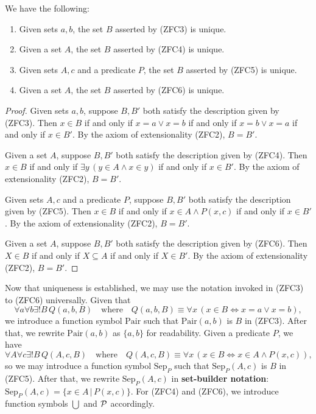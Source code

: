 \begin{prop}
	We have the following:
	\begin{enumerate}[itemsep=-0.4ex, label=\textup{(\alph*)}]
		\item Given sets $a, b$, the set $B$ asserted by \textup{(ZFC3)} is unique.
		\item Given a set $A$, the set $B$ asserted by \textup{(ZFC4)} is unique.
		\item Given sets $A, c$ and a predicate $P$, the set $B$ asserted by \textup{(ZFC5)} is unique.
		\item Given a set $A$, the set $B$ asserted by \textup{(ZFC6)} is unique.
	\end{enumerate}
\end{prop}
\begin{proof}
	Given sets $a, b$, suppose $B, B'$ both satisfy the description given by (ZFC3).
	Then $x\in B$ if and only if $x=a\lor x=b$ if and only if $x=b\lor x=a$ if and only if $x\in B'$.
	By the axiom of extensionality (ZFC2), $B = B'$.
	
	Given a set $A$, suppose $B, B'$ both satisfy the description given by (ZFC4).
	Then $x\in B$ if and only if $\exists y\, (y\in A\land x\in y)$ if and only if $x\in B'$.
	By the axiom of extensionality (ZFC2), $B = B'$.
	
	Given sets $A, c$ and a predicate $P$, suppose $B, B'$ both satisfy the description given by (ZFC5).
	Then $x\in B$ if and only if $x\in A \land P(x, c)$ if and only if $x\in B'$.
	By the axiom of extensionality (ZFC2), $B = B'$.
	
	Given a set $A$, suppose $B, B'$ both satisfy the description given by (ZFC6). 
	Then $X\in B$ if and only if $X\subseteq A$ if and only if $X\in B'$. 
	By the axiom of extensionality (ZFC2), $B = B'$.
\end{proof}

Now that uniqueness is established, we may use the notation invoked in (ZFC3) to (ZFC6) universally. 
Given that
\[ \forall a\forall b\exists ! B\, Q(a, b, B) \quad\text{where}\quad Q(a, b, B)\equiv \forall x\, (x\in B\iff x=a\lor x=b), \]
we introduce a function symbol $\textrm{Pair}$ such that $\textrm{Pair}(a, b)$ is $B$ in (ZFC3).
After that, we rewrite $\textrm{Pair}(a, b)$ as $\{a, b\}$ for readability. 
Given a predicate $P$, we have
\[ \forall A\forall c\exists ! B\, Q(A, c, B) \quad\text{where}\quad Q(A, c, B)\equiv \forall x\, (x\in B \iff x\in A\land P(x, c)), \]
so we may introduce a function symbol $\textrm{Sep}_{P}$ such that $\textrm{Sep}_{P}(A, c)$ is $B$ in (ZFC5).
After that, we rewrite $\textrm{Sep}_{P}(A, c)$ in \textbf{set-builder notation}: $\textrm{Sep}_{P}(A, c) = \{x\in A \,|\, P(x, c) \}$.
For (ZFC4) and (ZFC6), we introduce function symbols $\bigcup$ and $\mathcal{P}$ accordingly. 

